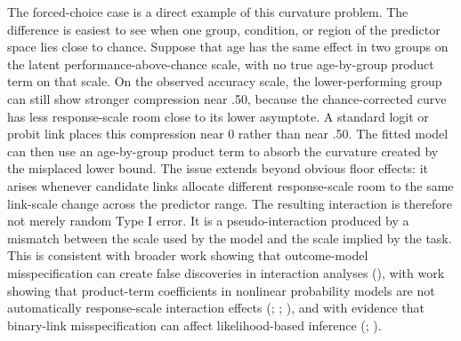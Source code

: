 \documentclass[
  man,
  longtable,
  nolmodern,
  notxfonts,
  notimes,
  colorlinks=true,linkcolor=blue,citecolor=blue,urlcolor=blue]{apa7}
\begin{document}
The forced-choice case is a direct example of this curvature problem.
The difference is easiest to see when one group, condition, or region of
the predictor space lies close to chance. Suppose that age has the same
effect in two groups on the latent performance-above-chance scale, with
no true age-by-group product term on that scale. On the observed
accuracy scale, the lower-performing group can still show stronger
compression near .50, because the chance-corrected curve has less
response-scale room close to its lower asymptote. A standard logit or
probit link places this compression near 0 rather than near .50. The
fitted model can then use an age-by-group product term to absorb the
curvature created by the misplaced lower bound. The issue extends beyond
obvious floor effects: it arises whenever candidate links allocate
different response-scale room to the same link-scale change across the
predictor range. The resulting interaction is therefore not merely
random Type I error. It is a pseudo-interaction produced by a mismatch
between the scale used by the model and the scale implied by the task.
This is consistent with broader work showing that outcome-model
misspecification can create false discoveries in interaction analyses
(), with work showing
that product-term coefficients in nonlinear probability models are not
automatically response-scale interaction effects
(;
;
), and with evidence that binary-link
misspecification can affect likelihood-based inference
(;
).
\end{document}
